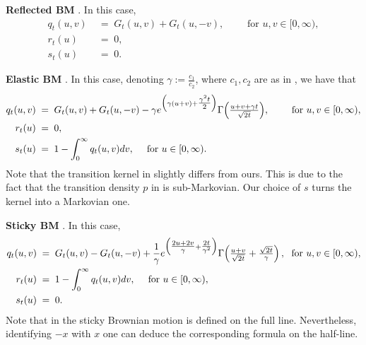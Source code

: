 \documentclass[12pt,a4paper]{article}
\theoremstyle{plain}
\theoremstyle{remark}
\newcommand{\pfrac}[2]{\genfrac{}{}{}{1}{#1}{#2}}
\begin{document}
	\textbf{Reflected BM} \cite[Page 120]{handbook}. In this case, 
	\begin{align*}
		{q}_t(u,v) & \;=\; G_t(u,v) +  G_t(u,- v),
		\qquad \text{ for }u,v\in [0,\infty),\\
		{r}_t(u) & \;=\; 0,\\
		{s}_t(u) & \;=\; 0.
	\end{align*}
	
	
	
	\textbf{Elastic BM} \cite[Page 125]{handbook}. In this case, denoting $\gamma := \frac{c_1}{c_2}$, where $c_1, c_2$ are as in \citealp[Theorem 2.10]{EFJP}, we have that
	\begin{align*}
		{q}_t(u,v) & \;=\; G_t(u,v) +  G_t(u,- v) - \gamma e^{\Big(\gamma(u + v) + \pfrac{\gamma^2t}{2}\Big)}\Gamma\Bigl(\pfrac{u + v + \gamma t}{\sqrt{2t}}\Bigr),
		\qquad \text{ for }u,v\in [0,\infty),\\
		{r}_t(u) & \;=\; 0, \\
		{s}_t(u) & \;=\;  1-  \int_0^\infty q_t(u,v)dv, \quad \text{ for } u\in [0,\infty).
	\end{align*}
	Note that the transition kernel in \cite{handbook} slightly differs from ours. This is due to the fact that the transition density $p$ in \cite{handbook} is sub-Markovian. Our choice of $s$ turns the kernel into a Markovian one.
	
	
	\textbf{Sticky BM} \cite[Pages 123-124]{handbook}. In this case,
	\begin{align*}
		{q}_t(u,v) & \;=\; G_t(u,v) -  G_t(u,- v) + \frac{1}{\gamma}e^{\Big(\pfrac{2u+ 2v}{\gamma} + \pfrac{2t}{\gamma^2}\Big)}\Gamma\Bigl(\pfrac{u+ v}{\sqrt{2t}} + \pfrac{\sqrt{2t}}{\gamma}\Bigr)\,,
		\;\text{ for }u,v\in [0,\infty),\\
		{r}_t(u) & \;=\; 1-  \int_0^\infty q_t(u,v)dv, \quad \text{ for } u\in [0,\infty),\\
		{s}_t(u) & \;=\; 0.
	\end{align*}
	Note that in \cite{handbook} the sticky Brownian motion is defined on the full line. Nevertheless, identifying $-x$ with $x$ one can deduce the corresponding formula on the half-line.
	
\end{document}
